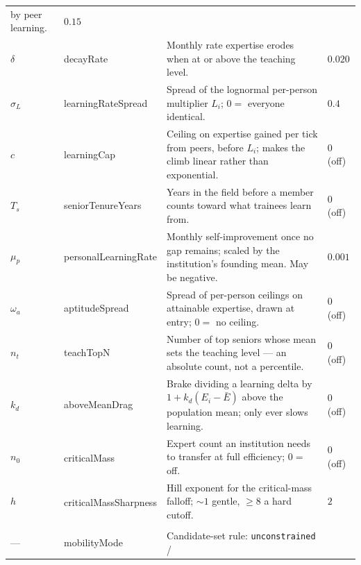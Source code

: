\documentclass[11pt]{article}
\newcommand{\dither}{\textnormal{---}}
\newcommand{\dg}{\textsuperscript{\dag}}
\begin{document}
\begin{longtable}{L{1.6cm} K{3.8cm} L{6.9cm} S{3.2cm}}
  by peer learning.
  & $0.15$ \\
$\delta$ & decayRate & Monthly rate expertise erodes when at or above the
  teaching level.
  & $0.020$ \\
$\sigma_L$ & learningRateSpread & Spread of the lognormal per-person multiplier
  $L_i$; $0 = $ everyone identical.
  & $0.4$ \\
$c$ & learningCap & Ceiling on expertise gained per tick from peers, before
  $L_i$; makes the climb linear rather than exponential.
  & $0$ (off) \\
$T_s$ & seniorTenureYears & Years in the field before a member counts toward what
  trainees learn from.
  & $0$ (off) \\
$\mu_p$ & personalLearningRate & Monthly self-improvement once no gap remains;
  scaled by the institution's founding mean. May be negative.
  & $0.001$ \\
$\omega_a$ & aptitudeSpread & Spread of per-person ceilings on attainable
  expertise, drawn at entry; $0 = $ no ceiling.
  & $0$ (off) \\
$n_t$ & teachTopN & Number of top seniors whose mean sets the teaching level ---
  an absolute count, not a percentile.
  & $0$ (off) \\
$k_d$ & aboveMeanDrag & Brake dividing a learning delta by
  $1 + k_d(E_i - \bar E)$ above the population mean; only ever slows learning.
  & $0$ (off) \\
$n_0$ & criticalMass\dg & Expert count an institution needs to transfer at full
  efficiency; $0 = $ off.
  & $0$ (off) \\
$h$ & criticalMassSharpness\dg & Hill exponent for the critical-mass falloff;
  ${\sim}1$ gentle, $\ge 8$ a hard cutoff.
  & $2$ \\
\addlinespace
{}\\[2pt]
\dither & mobilityMode & Candidate-set rule: \texttt{unconstrained} /

\end{longtable}
\end{document}

